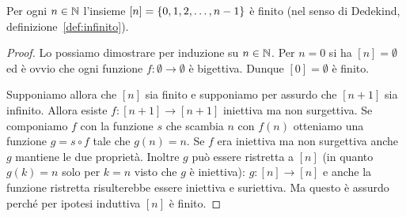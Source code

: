 \begin{lemma}\label{lm:infinito}
Per ogni $n\in {\mathbb N}$ l'insieme $[n]={\left\{ 0,1,2, \dots, n-1 \right\}}$ è 
finito (nel senso di Dedekind, definizione~\ref{def:infinito}).
\end{lemma}
%
\begin{proof}
Lo possiamo dimostrare per induzione su $n\in {\mathbb N}$.
Per $n=0$ si ha $[n]=\emptyset$ ed è ovvio che ogni funzione 
$f\colon \emptyset \to \emptyset$ è bigettiva. 
Dunque $[0]=\emptyset$ è finito.

Supponiamo allora che $[n]$ sia finito e supponiamo per assurdo che $[n+1]$ sia 
infinito.
Allora esiste $f\colon [n+1]\to[n+1]$ iniettiva ma non surgettiva. 
Se componiamo $f$ con la funzione $s$ che scambia $n$ con $f(n)$ otteniamo 
una funzione $g = s\circ f$ tale che $g(n)=n$.
Se $f$ era iniettiva ma non surgettiva anche $g$ mantiene le due proprietà.
Inoltre $g$ può essere ristretta a $[n]$ (in quanto $g(k)=n$ solo per $k=n$ 
visto che $g$ è iniettiva): $g\colon [n]\to [n]$
e anche la funzione ristretta risulterebbe essere iniettiva e suriettiva.
Ma questo è assurdo perché per ipotesi induttiva $[n]$ è finito.
\end{proof}


